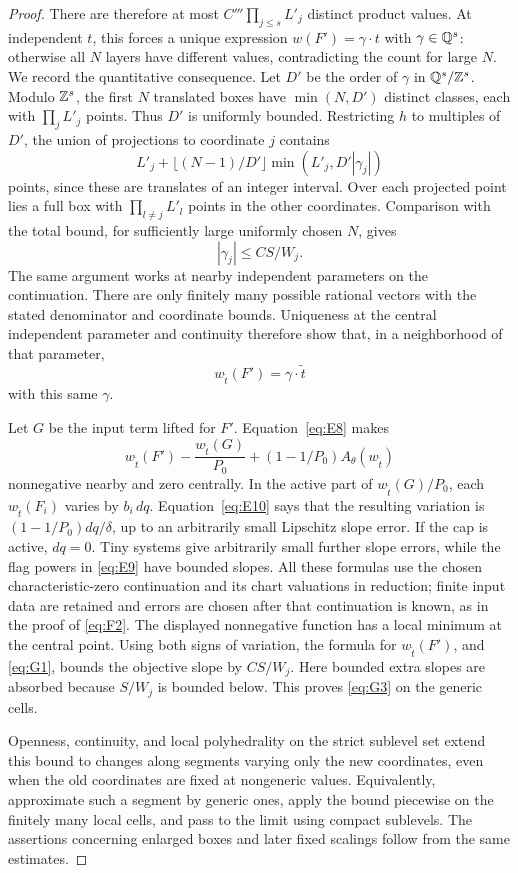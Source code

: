 \begin{proof}
There are therefore at most \(C'''\prod_{j\le s}L'_j\)
distinct product values.  At independent \(t\), this
forces a unique expression \(w(F')=\gamma\cdot t\)
with \(\gamma\in\mathbb Q^s\): otherwise all \(N\) layers
have different values, contradicting the count for
large \(N\).  We record the quantitative consequence.
Let \(D'\) be the order of \(\gamma\) in
\(\mathbb Q^s/\mathbb Z^s\).  Modulo \(\mathbb Z^s\), the first \(N\)
translated boxes have \(\min(N,D')\) distinct classes,
each with \(\prod_jL'_j\) points.  Thus \(D'\) is
uniformly bounded.  Restricting \(h\) to multiples
of \(D'\), the union of projections to coordinate
\(j\) contains
\[
 L'_j+\lfloor (N-1)/D'\rfloor
                  \min(L'_j,D'|\gamma_j|)
\]
points, since these are translates of an integer
interval.  Over each projected point lies a full
box with \(\prod_{l\ne j}L'_l\) points in the other
coordinates.  Comparison with the total bound, for
sufficiently large uniformly chosen \(N\), gives
\[
                    |\gamma_j|\le C S/W_j.
\]
The same argument works at nearby independent
parameters on the continuation.  There are only
finitely many possible rational vectors with the
stated denominator and coordinate bounds.  Uniqueness
at the central independent parameter and continuity
therefore show that, in a neighborhood of that parameter,
\[
                    w_{\widetilde t}(F')=
                                \gamma\cdot\widetilde t
\]
with this same \(\gamma\).

Let \(G\) be the input term lifted for \(F'\).
Equation~\eqref{eq:E8} makes
\[
 w_{\widetilde t}(F')-
        \frac{w_{\widetilde t}(G)}{P_0}
       +(1-1/P_0)A_\theta(w_{\widetilde t})
\]
nonnegative nearby and zero centrally.  In the active
part of \(w_{\widetilde t}(G)/P_0\), each
\(w_{\widetilde t}(F_i)\) varies by \(b_i\,dq\).
Equation~\eqref{eq:E10} says that the resulting
variation is \((1-1/P_0)dq/\delta\), up to an
arbitrarily small Lipschitz slope error.  If the cap
is active, \(dq=0\).  Tiny systems give arbitrarily
small further slope errors, while the flag powers
in \eqref{eq:E9} have bounded slopes.  All these
formulas use the chosen characteristic-zero continuation
and its chart valuations in reduction; finite input
data are retained and errors are chosen after that
continuation is known, as in the proof of \eqref{eq:F2}.
The displayed nonnegative function has a local minimum
at the central point.  Using both signs of variation,
the formula for \(w_{\widetilde t}(F')\), and
\eqref{eq:G1}, bounds the objective slope by
\(C S/W_j\).  Here bounded extra slopes are absorbed
because \(S/W_j\) is bounded below.  This proves
\eqref{eq:G3} on the generic cells.

Openness, continuity, and local polyhedrality on the
strict sublevel set extend this bound to changes along
segments varying only the new coordinates, even when
the old coordinates are fixed at nongeneric values.
Equivalently, approximate such a segment by generic
ones, apply the bound piecewise on the finitely many
local cells, and pass to the limit using compact
sublevels.  The assertions concerning enlarged boxes
and later fixed scalings follow from the same estimates.
\end{proof}

